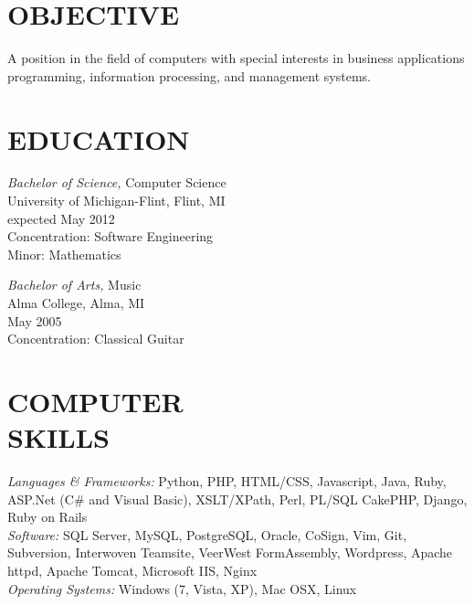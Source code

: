 \documentclass[line,margin]{res}
\begin{document}
\address{1450 Schafer Drive, Burton, MI 48509}
\address{(810) 412-8642 or (810) 931-1631}

 
\begin{resume}
 
\section{OBJECTIVE}       A position in the field of computers with special 
                interests in business applications programming, 
                information processing, and management systems. 
 
 
\section{EDUCATION} {\sl Bachelor of Science,} Computer Science \\
                University of Michigan-Flint, Flint, MI \\
                expected May 2012 \\
                Concentration: Software Engineering \\
                Minor: Mathematics

                {\sl Bachelor of Arts,} Music \\
                Alma College, Alma, MI \\
                May 2005 \\
                Concentration: Classical Guitar


\section{COMPUTER \\ SKILLS}
{\sl Languages \& Frameworks:} 
Python,
PHP,
HTML/CSS,
Javascript,
Java,
Ruby,
ASP.Net (C\# and Visual Basic),
XSLT/XPath,
Perl,
PL/SQL
CakePHP,
Django,
Ruby on Rails \\

{\sl Software:} 
SQL Server,
MySQL,
PostgreSQL,
Oracle,
CoSign,
Vim,
Git,
Subversion,
Interwoven Teamsite,
VeerWest FormAssembly,
Wordpress,
Apache httpd,
Apache Tomcat,
Microsoft IIS,
Nginx \\

{\sl Operating Systems:} Windows (7, Vista, XP), Mac OSX, Linux


\end{resume}
\end{document}
